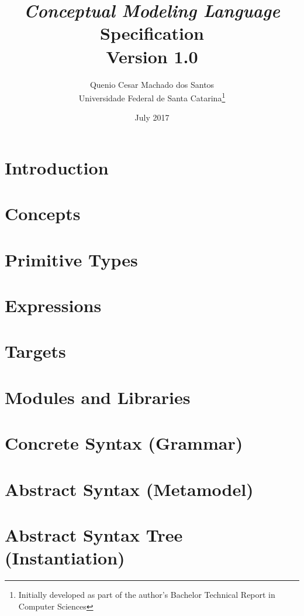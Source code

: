 \documentclass[a4paper,oneside,14pt, extrafontsizes]{memoir}
\title{\emph{Conceptual Modeling Language}\\Specification\\ \small{Version 1.0}}
\author{Quenio Cesar Machado dos Santos\\
\small{Universidade Federal de Santa Catarina}\thanks{
Initially developed as part of the author's Bachelor Technical Report in Computer Sciences}}
\date{July 2017}
\begin{document}
\begin{titlingpage}
\maketitle
\end{titlingpage}

\frontmatter

\begin{KeepFromToc}

\clearpage
\tableofcontents

\clearpage
\listoffigures

\clearpage
\listoftables 

\end{KeepFromToc}

\mainmatter

\chapter{Introduction}

\chapter{Concepts}

\chapter{Primitive Types}

\chapter{Expressions}

\chapter{Targets}

\chapter{Modules and Libraries}

\appendix

\chapter{Concrete Syntax (Grammar)}



\chapter{Abstract Syntax (Metamodel)}



\chapter{Abstract Syntax Tree (Instantiation)}



\backmatter
\end{document}
